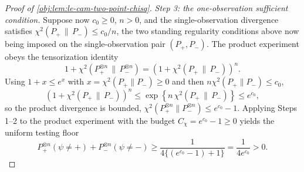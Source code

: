 \documentclass[11pt]{article}
\begin{document}
\begin{proof}[Proof of \cref{obj:lem:le-cam-two-point-chisq}]
\emph{Step 3: the one-observation sufficient condition.}  Suppose now \(c_0\ge0\), \(n>0\), and the single-observation divergence satisfies \(\chi^2(P_+\,\|\,P_-)\le c_0/n\), the two standing regularity conditions above now being imposed on the single-observation pair \((P_+,P_-)\).  The product experiment obeys the tensorization identity
\[
1+\chi^2(P_+^{\otimes n}\,\|\,P_-^{\otimes n})
=
\left(1+\chi^2(P_+\,\|\,P_-)\right)^n .
\]
Using \(1+x\le e^x\) with \(x=\chi^2(P_+\|P_-)\ge0\) and then \(n\chi^2(P_+\|P_-)\le c_0\),
\[
\left(1+\chi^2(P_+\,\|\,P_-)\right)^n
\le
\exp\left\{n\,\chi^2(P_+\,\|\,P_-)\right\}
\le e^{c_0},
\]
so the product divergence is bounded, \(\chi^2(P_+^{\otimes n}\|P_-^{\otimes n})\le e^{c_0}-1\).  Applying Steps 1--2 to the product experiment with the budget \(C_\chi=e^{c_0}-1\ge0\) yields the uniform testing floor
\[
P_+^{\otimes n}(\psi\ne+)+P_-^{\otimes n}(\psi\ne-)
\ge
\frac{1}{4\{(e^{c_0}-1)+1\}}
=
\frac{1}{4e^{c_0}}
>0 .
\]
\end{proof}
\end{document}
